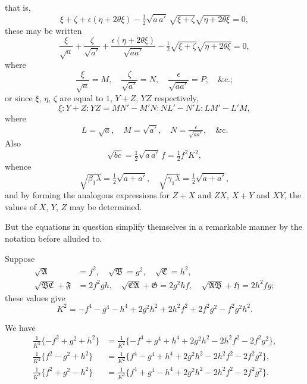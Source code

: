\documentclass[11pt]{article}
\begin{document}
that is,
\[
\xi + \zeta + \epsilon(\eta+2\theta\xi) - \tfrac{1}{2}\sqrt{a\,a'}\,\sqrt{\xi+\zeta}\sqrt{\eta+2\theta\xi} = 0,
\]
these may be written
\[
\frac{\xi}{\sqrt{a}} + \frac{\zeta}{\sqrt{a'}} + \frac{\epsilon(\eta+2\theta\xi)}{\sqrt{aa'}} - \tfrac{1}{2}\sqrt{\xi+\zeta}\sqrt{\eta+2\theta\xi} = 0,
\]
where
\[
\frac{\xi}{\sqrt{a}} = M, \quad \frac{\zeta}{\sqrt{a'}} = N, \quad \frac{\epsilon}{\sqrt{aa'}} = P, \quad \&\text{c.};
\]
or since $\xi$, $\eta$, $\zeta$ are equal to $1$, $Y+Z$, $YZ$ respectively,
\[
\xi : Y+Z : YZ = MN'-M'N : NL'-N'L : LM'-L'M,
\]
where
\[
L = \sqrt{a}, \quad M = \sqrt{a'}, \quad N = \tfrac{\epsilon}{\sqrt{aa'}}, \quad \&\text{c.}
\]
Also
\[
\sqrt{bc} = \tfrac{1}{2}\sqrt{a\,a'}\,f = \tfrac{1}{2}f^2K^2,
\]
whence
\[
\sqrt{\beta_1\lambda} = \tfrac{1}{2}\sqrt{a+a'}, \quad \sqrt{\gamma_1\lambda} = \tfrac{1}{2}\sqrt{a+a'},
\]
and by forming the analogous expressions for $Z+X$ and $ZX$, $X+Y$ and $XY$, the values of $X$, $Y$, $Z$ may be determined.

But the equations in question simplify themselves in a remarkable manner by the notation before alluded to.

\newpage
\setcounter{page}{76}

Suppose
\begin{align*}
\sqrt{\mathfrak{A}} &= f^2, \quad \sqrt{\mathfrak{B}} = g^2, \quad \sqrt{\mathfrak{C}} = h^2,\\
\sqrt{\mathfrak{B}\mathfrak{C}}+\mathfrak{F} &= 2f^2gh, \quad \sqrt{\mathfrak{C}\mathfrak{A}}+\mathfrak{G} = 2g^2hf, \quad \sqrt{\mathfrak{A}\mathfrak{B}}+\mathfrak{H} = 2h^2fg;
\end{align*}
these values give
\[
K^2 = -f^4-g^4-h^4+2g^2h^2+2h^2f^2+2f^2g^2-f^2g^2h^2.
\]

We have
\begin{align*}
\tfrac{1}{K^2}\{-f^2+g^2+h^2\} &= \tfrac{1}{K^2}\{-f^4+g^4+h^4+2g^2h^2-2h^2f^2-2f^2g^2\},\\
\tfrac{1}{K^2}\{f^2-g^2+h^2\} &= \tfrac{1}{K^2}\{f^4-g^4+h^4+2g^2h^2-2h^2f^2-2f^2g^2\},\\
\tfrac{1}{K^2}\{f^2+g^2-h^2\} &= \tfrac{1}{K^2}\{f^4+g^4-h^4+2g^2h^2-2h^2f^2-2f^2g^2\}.
\end{align*}
\end{document}
